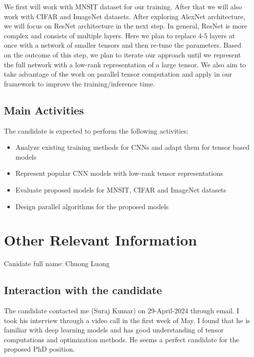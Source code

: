 \documentclass[11pt]{article}
\begin{document}
We first will work with  MNSIT dataset for our training. After that we will also work with CIFAR and ImageNet datasets. After exploring AlexNet architecture, we will focus on ResNet architecture in the next step. In general, ResNet is more complex and consists of  multiple layers. Here we plan to replace 4-5 layers at once with a network of smaller tensors and then re-tune the parameters. Based on the outcome of this step, we plan to iterate our approach until we represent the full network with a low-rank representation of a large tensor. We also aim to take advantage of the  work on parallel tensor computation and apply in our framework to improve the training/inference time.


\subsection*{Main Activities}

The candidate is expected to perform the following activities:
\begin{itemize}
	\item Analyze existing training methods for CNNs and adapt them for tensor based models
	\item Represent popular CNN models with low-rank tensor representations
	\item Evaluate proposed models for MNSIT, CIFAR and ImageNet datasets
	\item Design parallel algorithms for the proposed models
\end{itemize}

%

\newpage

\section{Other Relevant Information}
Canidate full name: Chuong Luong
\subsection*{Interaction with the candidate}
The candidate contacted me (Suraj Kumar) on 29-April-2024 through email. I took his interview through a video call in the first week of May. I found that he is familiar with deep learning models and has good understanding of tensor computations and optimization methods. He seems a perfect candidate for the proposed PhD position. 
 
\end{document}
